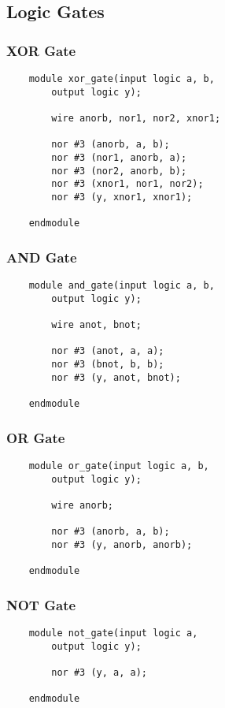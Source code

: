 \documentclass[../main]{subfiles}
\begin{document}
\subsection {Logic Gates}

\subsubsection {XOR Gate}

\begin{verbatim}
    module xor_gate(input logic a, b,
        output logic y);

        wire anorb, nor1, nor2, xnor1;

        nor #3 (anorb, a, b);
        nor #3 (nor1, anorb, a);
        nor #3 (nor2, anorb, b);
        nor #3 (xnor1, nor1, nor2);
        nor #3 (y, xnor1, xnor1);

    endmodule
\end{verbatim}

\subsubsection {AND Gate}

\begin{verbatim}
    module and_gate(input logic a, b,
        output logic y);

        wire anot, bnot;

        nor #3 (anot, a, a);
        nor #3 (bnot, b, b);
        nor #3 (y, anot, bnot);

    endmodule
\end{verbatim}

\subsubsection {OR Gate}

\begin{verbatim}
    module or_gate(input logic a, b,
        output logic y);

        wire anorb;

        nor #3 (anorb, a, b);
        nor #3 (y, anorb, anorb);

    endmodule
\end{verbatim}

\subsubsection {NOT Gate}

\begin{verbatim}
    module not_gate(input logic a,
        output logic y);

        nor #3 (y, a, a);

    endmodule
\end{verbatim}
\end{document}
